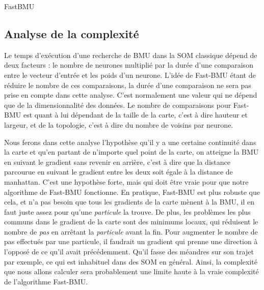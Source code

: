 	\begin{algorithm}
	\caption{FastBMU}
	\label{fast:alg:bmu}
	\DontPrintSemicolon

	\end{algorithm}

	\subsection{Analyse de la complexité}\label{seq:complex_analysis}

	Le temps d'exécution d'une recherche de BMU dans la SOM classique dépend de deux facteurs : le nombre de neurones multiplié par la durée d'une comparaison entre le vecteur d'entrée et les poids d'un neurone. L'idée de Fast-BMU étant de réduire le nombre de ces comparaisons, la durée d'une comparaison ne sera pas prise en compte dans cette analyse. C'est normalement une valeur qui ne dépend que de la dimensionnalité des données. Le nombre de comparaisons pour Fast-BMU est quant à lui dépendant de la taille de la carte, c'est à dire hauteur et largeur, et de la topologie, c'est à dire du nombre de voisins par neurone. 

	Nous ferons dans cette analyse l'hypothèse qu'il y a une certaine continuité dans la carte et qu'en partant de n'importe quel point de la carte, on atteigne la BMU en suivant le gradient sans revenir en arrière, c'est à dire que la distance parcourue en suivant le gradient entre les deux soit égale à la distance de manhattan. C'est une hypothèse forte, mais qui doit être vraie pour que notre algorithme de Fast-BMU fonctionne. En pratique, Fast-BMU est plus robuste que cela, et n'a pas besoin que tous les gradients de la carte mènent à la BMU, il en faut juste assez pour qu'une \textit{particule} la trouve. De plus, les problèmes les plus communs dans le gradient de la carte sont des minimums locaux, qui réduisent le nombre de \textit{pas} en arrêtant la \textit{particule} avant la fin. Pour augmenter le nombre de pas effectués par une particule, il faudrait un gradient qui prenne une direction à l'opposé de ce qu'il avait précédemment. Qu'il fasse des méandres sur son trajet par exemple, ce qui est inhabituel dans des SOM en général. Ainsi, la complexité que nous allons calculer sera probablement une limite haute à la vraie complexité de l'algorithme Fast-BMU. 

